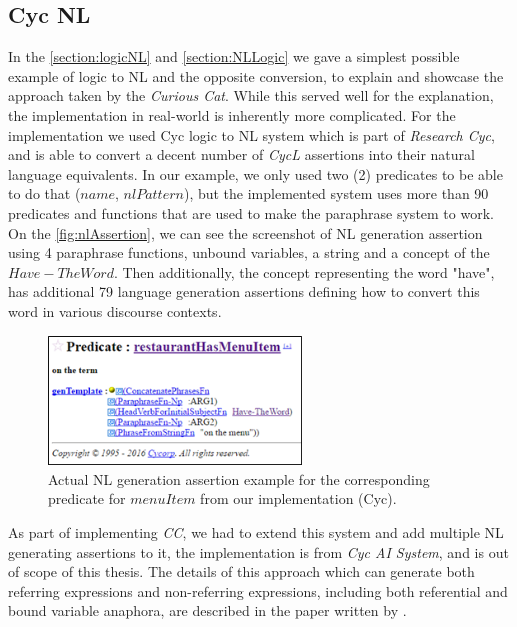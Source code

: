 \subsection{Cyc NL}
\label{section:cycnl}
In the \autoref{section:logicNL} and \autoref{section:NLLogic} we gave a 
simplest possible 
example of logic to NL and the opposite conversion, to explain and showcase the
approach taken by the \emph{Curious Cat}. While this served well for the
explanation, the implementation in real-world is inherently more complicated.
For the implementation we used Cyc logic to NL system which is part of 
\emph{Research Cyc}\autocite{Coppock2010,Baxter2005}, and is able to convert
a decent number of \emph{CycL} assertions into their natural language 
equivalents. In our example, we only used two (2) predicates to be able to
do that ($name$, $nlPattern$), but the implemented system uses more than
90 predicates and functions that are used to make the paraphrase system to work.
On the \autoref{fig:nlAssertion}, we can see the screenshot of
NL generation assertion using 4 paraphrase functions, unbound variables,
a string and a concept of the $Have-TheWord$. Then additionally, the concept
representing the word "have", has additional 79 language generation assertions
defining how to convert this word in various discourse contexts. 

\begin{figure}[h]
	\centering
		\includegraphics[width=0.6\textwidth]{figures/nlAssertion.png}
	\caption{Actual NL generation assertion example for the corresponding predicate for 
		$menuItem$ from our implementation (Cyc).}
	\label{fig:nlAssertion}
\end{figure}

As part of implementing \emph{CC}, we had
to extend this system and add multiple NL generating assertions to it, the
implementation is from \emph{Cyc AI System}, and is out of scope of this 
thesis. The details of this approach which can generate both referring 
expressions and non-referring expressions, including both referential and 
bound variable anaphora, are described in the paper written by
\textcite{Coppock2010}. 

